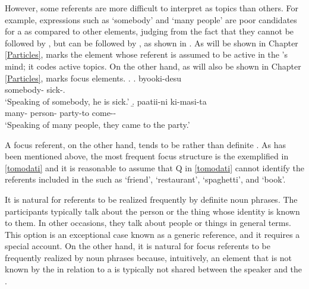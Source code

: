 However,
some  referents are more difficult to interpret as topics than others.
For example, expressions such as  `somebody' and  `many people' are poor candidates for a  as compared to other elements,
judging from the fact that they cannot be followed by , but can be followed by , as shown in \Next \cite[][p.\ 37 ff.]{kuno73}.
As will be shown in Chapter \ref{Particles},
 marks the element whose referent is assumed to be active in the 's mind;
it codes active topics.
On the other hand, as will also be shown in Chapter \ref{Particles},
 marks focus elements.
\ex. \a.  byooki-desu \\
		somebody- sick-. \\
		`Speaking of somebody, he is sick.'
	\b.   paatii-ni ki-masi-ta \\
		many- person- party-to come-- \\
		`Speaking of many people, they came to the party.'



A focus referent, on the other hand,
tends to be  rather than definite \cite{givon76,keenan76,comrie79,comrie83,dubois87}.
As has been mentioned above,
the most frequent focus structure is the  exemplified in \ref{tomodati} and
it is reasonable to assume that Q in \ref{tomodati} cannot identify the referents included in the  such as `friend', `restaurant', `spaghetti', and `book'.

%

It is natural for  referents to be realized frequently by definite noun phrases.
The participants typically talk about the person or the thing whose identity is known to them.
In other occasions, they talk about people or things in general terms.
This option is an exceptional case known as a generic reference, and it requires a special account.
On the other hand, it is natural for focus referents to be frequently realized by  noun phrases
because, intuitively, an element that is not known by the  in relation to a  is typically not shared between the speaker and the .


